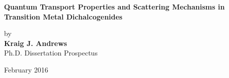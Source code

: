 \setcounter{page}{1}
\thispagestyle{empty}
\begin{titlepage}

	\begin{center}

	\singlespacing
	\textbf{Quantum Transport Properties and Scattering Mechanisms in Transition Metal Dichalcogenides}\\
	\doublespacing
	
	by\\
	
	\textbf{Kraig J. Andrews}\\
	Ph.D. Dissertation Prospectus\\ 
	\vspace{1.0cm}

	February 2016\\
	\end{center}
	
	\begin{flushright}

   \vspace{1.0cm}
	 \\
   \vspace{0.7cm}
	\makebox[8.7cm][l]{$\overline {\hspace{7.8cm}}$} \\
   \vspace{0.9cm}
	\makebox[8.7cm][l]{$\overline {\hspace{7.8cm}}$} \\
   \vspace{0.9cm}
	\makebox[8.7cm][l]{$\overline {\hspace{7.8cm}}$} \\
	\end{flushright}
\end{titlepage}

